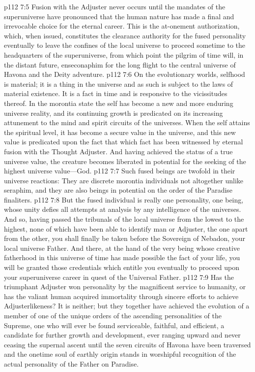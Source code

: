 \vs p112 7:5 Fusion with the Adjuster never occurs until the mandates of the superuniverse have pronounced that the human nature has made a final and irrevocable choice for the eternal career. This is the at\hyp{}onement authorization, which, when issued, constitutes the clearance authority for the fused personality eventually to leave the confines of the local universe to proceed sometime to the headquarters of the superuniverse, from which point the pilgrim of time will, in the distant future, enseconaphim for the long flight to the central universe of Havona and the Deity adventure.
\pc \vs p112 7:6 On the evolutionary worlds, selfhood is material; it is a thing in the universe and as such is subject to the laws of material existence. It is a fact in time and is responsive to the vicissitudes thereof.  In the morontia state the self has become a new and more enduring universe reality, and its continuing growth is predicated on its increasing attunement to the mind and spirit circuits of the universes.  When the self attains the spiritual level, it has become a secure value in the universe, and this new value is predicated upon the fact that  which fact has been witnessed by eternal fusion with the Thought Adjuster. And having achieved the status of a true universe value, the creature becomes liberated in potential for the seeking of the highest universe value---God.
\pc \vs p112 7:7 Such fused beings are twofold in their universe reactions: They are discrete morontia individuals not altogether unlike seraphim, and they are also beings in potential on the order of the Paradise finaliters.
\vs p112 7:8 But the fused individual is really one personality, one being, whose unity defies all attempts at analysis by any intelligence of the universes. And so, having passed the tribunals of the local universe from the lowest to the highest, none of which have been able to identify man or Adjuster, the one apart from the other, you shall finally be taken before the Sovereign of Nebadon, your local universe Father. And there, at the hand of the very being whose creative fatherhood in this universe of time has made possible the fact of your life, you will be granted those credentials which entitle you eventually to proceed upon your superuniverse career in quest of the Universal Father.
\vs p112 7:9 Has the triumphant Adjuster won personality by the magnificent service to humanity, or has the valiant human acquired immortality through sincere efforts to achieve Adjusterlikeness? It is neither; but they together have achieved the evolution of a member of one of the unique orders of the ascending personalities of the Supreme, one who will ever be found serviceable, faithful, and efficient, a candidate for further growth and development, ever ranging upward and never ceasing the supernal ascent until the seven circuits of Havona have been traversed and the onetime soul of earthly origin stands in worshipful recognition of the actual personality of the Father on Paradise.
